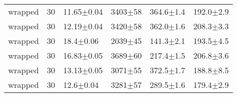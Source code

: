 \begin{tabular}{lrllll}
      wrapped &      30 &   11.65$\pm$0.04 &  3403$\pm$58 &  364.6$\pm$1.4 &   192.0$\pm$2.9 \\
      wrapped &      30 &   12.19$\pm$0.04 &  3420$\pm$58 &  362.0$\pm$1.6 &   208.3$\pm$3.3 \\
      wrapped &      30 &    18.4$\pm$0.06 &  2039$\pm$45 &  141.3$\pm$2.1 &   193.5$\pm$4.5 \\
      wrapped &      30 &   16.83$\pm$0.05 &  3689$\pm$60 &  217.4$\pm$1.5 &   206.8$\pm$3.6 \\
      wrapped &      30 &   13.13$\pm$0.05 &  3071$\pm$55 &  372.5$\pm$1.7 &   188.8$\pm$8.5 \\
      wrapped &      30 &    12.6$\pm$0.04 &  3281$\pm$57 &  289.5$\pm$1.6 &   179.4$\pm$2.9 \\
\bottomrule
\end{tabular}
